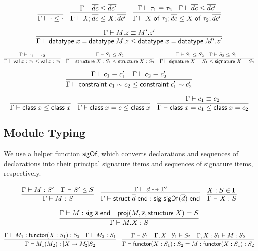 \documentclass{article}
\newcommand{\mt}[1]{\mathsf{#1}}
\begin{document}
$$\infer{\Gamma \vdash \cdot \leq \cdot}{}
\quad \infer{\Gamma \vdash X; \overline{dc} \leq X; \overline{dc'}}{
  \Gamma \vdash \overline{dc} \leq \overline{dc'}
}
\quad \infer{\Gamma \vdash X \; \mt{of} \; \tau_1; \overline{dc} \leq X \; \mt{of} \; \tau_2; \overline{dc'}}{
  \Gamma \vdash \tau_1 \equiv \tau_2
  & \Gamma \vdash \overline{dc} \leq \overline{dc'}
}$$

$$\infer{\Gamma \vdash \mt{datatype} \; x = \mt{datatype} \; M.z \leq \mt{datatype} \; x = \mt{datatype} \; M'.z'}{
  \Gamma \vdash M.z \equiv M'.z'
}$$

$$\infer{\Gamma \vdash \mt{val} \; x : \tau_1 \leq \mt{val} \; x : \tau_2}{
  \Gamma \vdash \tau_1 \equiv \tau_2
}
\quad \infer{\Gamma \vdash \mt{structure} \; X : S_1 \leq \mt{structure} \; X : S_2}{
  \Gamma \vdash S_1 \leq S_2
}
\quad \infer{\Gamma \vdash \mt{signature} \; X = S_1 \leq \mt{signature} \; X = S_2}{
  \Gamma \vdash S_1 \leq S_2
  & \Gamma \vdash S_2 \leq S_1
}$$

$$\infer{\Gamma \vdash \mt{constraint} \; c_1 \sim c_2 \leq \mt{constraint} \; c'_1 \sim c'_2}{
  \Gamma \vdash c_1 \equiv c'_1
  & \Gamma \vdash c_2 \equiv c'_2
}$$

$$\infer{\Gamma \vdash \mt{class} \; x \leq \mt{class} \; x}{}
\quad \infer{\Gamma \vdash \mt{class} \; x = c \leq \mt{class} \; x}{}
\quad \infer{\Gamma \vdash \mt{class} \; x = c_1 \leq \mt{class} \; x = c_2}{
  \Gamma \vdash c_1 \equiv c_2
}$$

\subsection{Module Typing}

We use a helper function $\mt{sigOf}$, which converts declarations and sequences of declarations into their principal signature items and sequences of signature items, respectively.

$$\infer{\Gamma \vdash M : S}{
  \Gamma \vdash M : S'
  & \Gamma \vdash S' \leq S
}
\quad \infer{\Gamma \vdash \mt{struct} \; \overline{d} \; \mt{end} : \mt{sig} \; \mt{sigOf}(\overline{d}) \; \mt{end}}{
  \Gamma \vdash \overline{d} \leadsto \Gamma'
}
\quad \infer{\Gamma \vdash X : S}{
  X : S \in \Gamma
}$$

$$\infer{\Gamma \vdash M.X : S}{
  \Gamma \vdash M : \mt{sig} \; \overline{s} \; \mt{end}
  & \mt{proj}(M, \overline{s}, \mt{structure} \; X) = S
}$$

$$\infer{\Gamma \vdash M_1(M_2) : [X \mapsto M_2]S_2}{
  \Gamma \vdash M_1 : \mt{functor}(X : S_1) : S_2
  & \Gamma \vdash M_2 : S_1
}
\quad \infer{\Gamma \vdash \mt{functor} (X : S_1) : S_2 = M : \mt{functor} (X : S_1) : S_2}{
  \Gamma \vdash S_1
  & \Gamma, X : S_1 \vdash S_2
  & \Gamma, X : S_1 \vdash M : S_2
}$$
\end{document}
